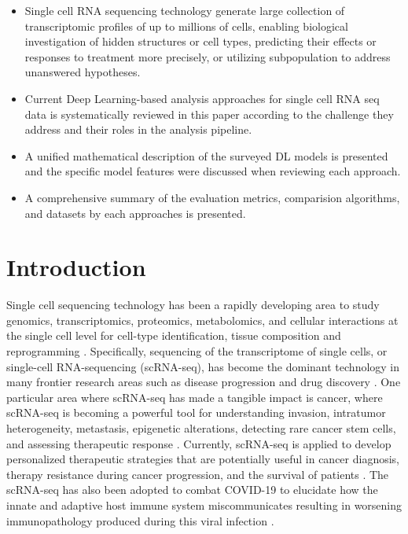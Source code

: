 \documentclass[
]{book}
\providecommand{\tightlist}{%
  \setlength{\itemsep}{0pt}\setlength{\parskip}{0pt}}
\begin{document}
\begin{itemize}
\tightlist
\item
  Single cell RNA sequencing technology generate large collection of transcriptomic profiles of up to millions of cells, enabling biological investigation of hidden structures or cell types, predicting their effects or responses to treatment more precisely, or utilizing subpopulation to address unanswered hypotheses.
\item
  Current Deep Learning-based analysis approaches for single cell RNA seq data is systematically reviewed in this paper according to the challenge they address and their roles in the analysis pipeline.
\item
  A unified mathematical description of the surveyed DL models is presented and the specific model features were discussed when reviewing each approach.\\
\item
  A comprehensive summary of the evaluation metrics, comparision algorithms, and datasets by each approaches is presented.
\end{itemize}

\hypertarget{ch-1}{%
\chapter{Introduction}\label{ch-1}}

Single cell sequencing technology has been a rapidly developing area to study genomics, transcriptomics, proteomics, metabolomics, and cellular interactions at the single cell level for cell-type identification, tissue composition and reprogramming \citep{RN87, RN98}. Specifically, sequencing of the transcriptome of single cells, or single-cell RNA-sequencing (scRNA-seq), has become the dominant technology in many frontier research areas such as disease progression and drug discovery \citep{RN101, RN78, RN85}. One particular area where scRNA-seq has made a tangible impact is cancer, where scRNA-seq is becoming a powerful tool for understanding invasion, intratumor heterogeneity, metastasis, epigenetic alterations, detecting rare cancer stem cells, and assessing therapeutic response . Currently, scRNA-seq is applied to develop personalized therapeutic strategies that are potentially useful in cancer diagnosis, therapy resistance during cancer progression, and the survival of patients \citep{RN59, RN91}. The scRNA-seq has also been adopted to combat COVID-19 to elucidate how the innate and adaptive host immune system miscommunicates resulting in worsening immunopathology produced during this viral infection \citep{RN99}.
\end{document}
